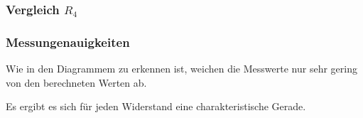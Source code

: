 \documentclass[10pt]{report}
\begin{document}
        \subsubsection{Vergleich $R_4$}
        \begin{center}
        \end{center}


        \subsubsection{Messungenauigkeiten}
        Wie in den Diagrammem zu erkennen ist, weichen die Messwerte nur sehr
        gering von den berechneten Werten ab.

        Es ergibt es sich für jeden Widerstand eine charakteristische Gerade.
\end{document}
